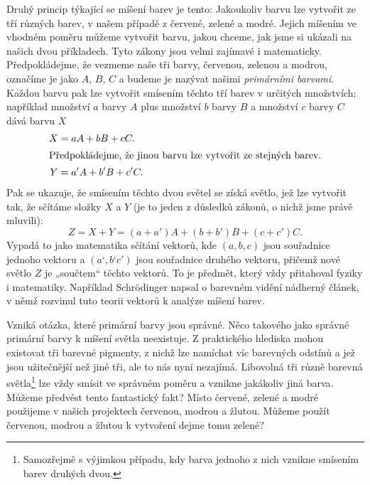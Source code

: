     Druhý princip týkající se míšení barev je tento: Jakoukoliv barvu lze vytvořit ze tří různých 
    barev, v našem případě z červené, zelené a modré. Jejich míšením ve vhodném poměru můžeme 
    vytvořit barvu, jakou chceme, jak jsme si ukázali na našich dvou příkladech. Tyto zákony jsou 
    velmi zajímavé i matematicky. Předpokládejme, že vezmeme naše tři barvy, červenou, zelenou a 
    modrou, označíme je jako \(A\), \(B\), \(C\) a budeme je nazývat našimi \emph{primárními 
    barvami}. Každou barvu pak lze vytvořit smísením těchto tří barev v určitých množstvích; 
    například množství \(a\) barvy \(A\) plus množství \(b\) barvy \(B\) a množství \(c\) barvy 
    \(C\) dává barvu \(X\)
    \begin{align}
      X &= aA + bB + cC.     \label{fyz:eq231}     \\
      \shortintertext{Předpokládejme, že jinou barvu lze vytvořit ze stejných barev.}
      Y &= a'A + b'B + c'C.  \label{fyz:eq232}
    \end{align}
    Pak se ukazuje, že smísením těchto dvou světel se získá světlo, jež lze vytvořit tak, že 
    sčítáme složky \(X\) a \(Y\) (je to jeden z důsledků zákonů, o nichž jsme právě mluvili):
    \begin{equation}\label{fyz:eq233}
      Z = X + Y = (a+a')A + (b+b')B + (c+c')C.
    \end{equation}
    Vypadá to jako matematika sčítání vektorů, kde \((a, b, c)\) jsou souřadnice jednoho vektoru a 
    \((a‘, b‘ c')\) jsou souřadnice druhého vektoru, přičemž nové světlo \(Z\) je „součtem“ těchto 
    vektorů. To je předmět, který vždy přitahoval fyziky i matematiky. Například Schr{\"o}dinger 
    napsal o barevném vidění nádherný článek, v němž rozvinul tuto teorii vektorů k analýze míšení 
    barev.
    
    Vzniká otázka, které primární barvy jsou správné. Něco takového jako správné primární barvy k 
    míšení světla neexistuje. Z praktického hlediska mohou existovat tři barevné pigmenty, z nichž 
    lze namíchat víc barevných odstínů a jež jsou užitečnější než jiné tři, ale to nás nyní 
    nezajímá. Libovolná tři různě barevná světla\footnote{ Samozřejmě s výjimkou případu, kdy barva 
    jednoho z nich vznikne smísením barev druhých dvou. } lze vždy smísit ve správném poměru a 
    vznikne jakákoliv jiná barva. Můžeme předvést tento fantastický fakt? Místo červené, zelené a 
    modré použijeme v našich projektech červenou, modrou a žlutou. Můžeme použít červenou, modrou a 
    žlutou k vytvoření dejme tomu zelené?
    
